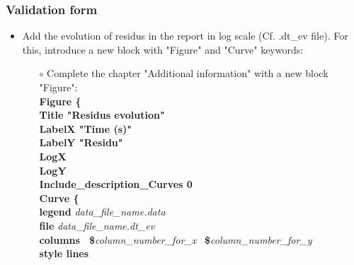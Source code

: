 \documentclass[10pt, hyperref={unicode=true,pdfusetitle, bookmarks=true,bookmarksnumbered=false,bookmarksopen=false, breaklinks=false,pdfborder={0 0 1},backref=true,colorlinks=true,linkcolor=darkblue,pageanchor}]{beamer}
\begin{document}
\begin{frame}
\frametitle{Validation form}
\begin{block}{}

\begin{itemize}
\item Add the evolution of residus in the report in log scale (Cf. .dt\_ev file). For this, introduce a new block with "Figure" and "Curve" keywords:
    \begin{itemize}
    \item [$\circ$] Complete the chapter "Additional information" with a new block "Figure":\\
    {\scriptsize{
    \hspace{.3cm} \textbf{Figure \{}  \\
    \hspace{.6cm} \textbf{Title "Residus evolution"}  \\
    \hspace{.6cm} \textbf{LabelX "Time (s)"}  \\
    \hspace{.6cm} \textbf{LabelY "Residu"}  \\
    \hspace{.6cm} \textbf{LogX}  \\
    \hspace{.6cm} \textbf{LogY}  \\
    \hspace{.6cm} \textbf{Include\_description\_Curves 0}  \\
    \hspace{.6cm} \textbf{Curve \{ }  \\
    \hspace{.8cm} \textbf{legend} \textit{data\_file\_name.data}  \\
    \hspace{.8cm} \textbf{file} \textit{data\_file\_name.dt\_ev} \\
    \hspace{.8cm} \textbf{columns \, \$}\textit{column\_number\_for\_x} \, \textbf{\$}\textit{column\_number\_for\_y }  \\
    \hspace{.8cm} \textbf{style lines} \\
}}
\end{itemize}
\end{itemize}
\end{block}
\end{frame}
\end{document}
